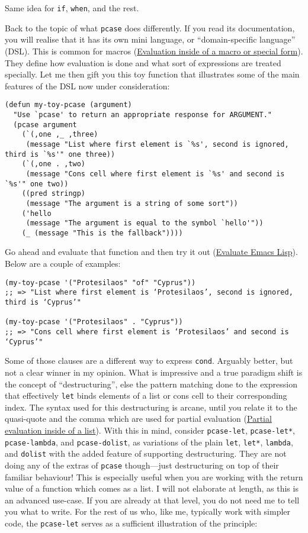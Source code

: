 \documentclass[11pt]{ctexart}
\begin{document}
Same idea for \texttt{if}, \texttt{when}, and the rest.

Back to the topic of what \texttt{pcase} does differently. If you read its documentation, you will realise that it has its own mini language, or ``domain-specific language'' (DSL). This is common for macros (\hyperref[sec:org61e1a1b]{Evaluation inside of a macro or special form}). They define how evaluation is done and what sort of expressions are treated specially. Let me then gift you this toy function that illustrates some of the main features of the DSL now under consideration:

\begin{verbatim}
(defun my-toy-pcase (argument)
  "Use `pcase' to return an appropriate response for ARGUMENT."
  (pcase argument
    (`(,one ,_ ,three)
     (message "List where first element is `%s', second is ignored, third is `%s'" one three))
    (`(,one . ,two)
     (message "Cons cell where first element is `%s' and second is `%s'" one two))
    ((pred stringp)
     (message "The argument is a string of some sort"))
    ('hello
     (message "The argument is equal to the symbol `hello'"))
    (_ (message "This is the fallback"))))
\end{verbatim}

Go ahead and evaluate that function and then try it out (\hyperref[sec:org91f7fd8]{Evaluate Emacs Lisp}). Below are a couple of examples:

\begin{verbatim}
(my-toy-pcase '("Protesilaos" "of" "Cyprus"))
;; => "List where first element is ‘Protesilaos’, second is ignored, third is ‘Cyprus’"

(my-toy-pcase '("Protesilaos" . "Cyprus"))
;; => "Cons cell where first element is ‘Protesilaos’ and second is ‘Cyprus’"
\end{verbatim}

Some of those clauses are a different way to express \texttt{cond}. Arguably better, but not a clear winner in my opinion. What is impressive and a true paradigm shift is the concept of ``destructuring'', else the pattern matching done to the expression that effectively \texttt{let} binds elements of a list or cons cell to their corresponding index. The syntax used for this destructuring is arcane, until you relate it to the quasi-quote and the comma which are used for partial evaluation (\hyperref[sec:org771b57a]{Partial evaluation inside of a list}). With this in mind, consider \texttt{pcase-let}, \texttt{pcase-let*}, \texttt{pcase-lambda}, and \texttt{pcase-dolist}, as variations of the plain \texttt{let}, \texttt{let*}, \texttt{lambda}, and \texttt{dolist} with the added feature of supporting destructuring. They are not doing any of the extras of \texttt{pcase} though---just destructuring on top of their familiar behaviour! This is especially useful when you are working with the return value of a function which comes as a list. I will not elaborate at length, as this is an advanced use-case. If you are already at that level, you do not need me to tell you what to write. For the rest of us who, like me, typically work with simpler code, the \texttt{pcase-let} serves as a sufficient illustration of the principle:
\end{document}
